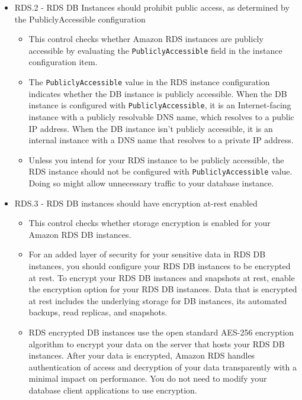 \begin{mdframed}[backgroundcolor=gray!05, linecolor=gray!50]
\itshape
\begin{itemize}
    \item  RDS.2 - RDS DB Instances should prohibit public access, as determined by the PubliclyAccessible configuration
    \begin{itemize}
        \item This control checks whether Amazon RDS instances are publicly accessible by evaluating the \texttt{PubliclyAccessible} field in the instance configuration item.
        \item The \texttt{PubliclyAccessible} value in the RDS instance configuration indicates whether the DB instance is publicly accessible. When the DB instance is configured with \texttt{PubliclyAccessible}, it is an Internet-facing instance with a publicly resolvable DNS name, which resolves to a public IP address. When the DB instance isn't publicly accessible, it is an internal instance with a DNS name that resolves to a private IP address.
        \item Unless you intend for your RDS instance to be publicly accessible, the RDS instance should not be configured with \texttt{PubliclyAccessible} value. Doing so might allow unnecessary traffic to your database instance.
    \end{itemize}
    \item RDS.3 - RDS DB instances should have encryption at-rest enabled
    \begin{itemize}
        \item This control checks whether storage encryption is enabled for your Amazon RDS DB instances.
        \item For an added layer of security for your sensitive data in RDS DB instances, you should configure your RDS DB instances to be encrypted at rest. To encrypt your RDS DB instances and snapshots at rest, enable the encryption option for your RDS DB instances. Data that is encrypted at rest includes the underlying storage for DB instances, its automated backups, read replicas, and snapshots.
        \item RDS encrypted DB instances use the open standard AES-256 encryption algorithm to encrypt your data on the server that hosts your RDS DB instances. After your data is encrypted, Amazon RDS handles authentication of access and decryption of your data transparently with a minimal impact on performance. You do not need to modify your database client applications to use encryption.

\end{itemize}
\end{itemize}
\end{mdframed}
